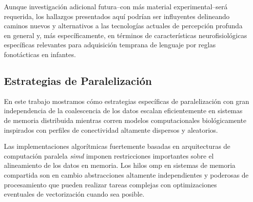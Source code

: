 Aunque investigación adicional futura--con más material experimental--será requerida, los hallazgos presentados aquí podrían ser influyentes delineando caminos nuevos y alternativos a las tecnologías actuales de percepción profunda en general y, más específicamente, en términos de características neurofisiológicas específicas relevantes para adquisición temprana de lenguaje por reglas fonotácticas en infantes.













\subsection{Estrategias de Paralelización}

En este trabajo mostramos cómo estrategias específicas de paralelización con gran independencia de la coalescencia de los datos escalan eficientemente en sistemas de memoria distribuida mientras corren modelos computacionales biológicamente inspirados con perfiles de conectividad altamente dispersos y aleatorios.

Las implementaciones algorítmicas fuertemente basadas en arquitecturas de computación paralela \emph{\gls{simd}} imponen restricciones importantes sobre el alineamiento de los datos en memoria.
Los hilos \gls{omp} en sistemas de memoria compartida son en cambio abstracciones altamente independientes y poderosas de procesamiento que pueden realizar tareas complejas con optimizaciones eventuales de vectorización cuando sea posible.

